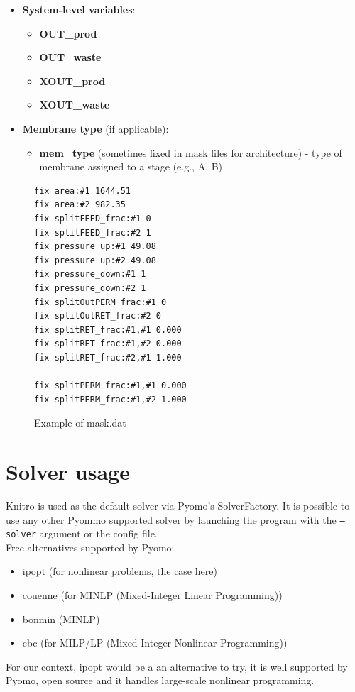 \documentclass[12pt]{article}
\theoremstyle{definition}
\theoremstyle{definition}
\theoremstyle{remark}
\theoremstyle{remark}
\theoremstyle{definition}
\theoremstyle{remark}
\begin{document}
\begin{itemize}
\item \textbf{System-level variables}:
\begin{itemize}
  \item \textbf{OUT\_prod}
  \item \textbf{OUT\_waste}
  \item \textbf{XOUT\_prod}
  \item \textbf{XOUT\_waste}
\end{itemize}

\item \textbf{Membrane type} (if applicable):
	\begin{itemize}
  \item \textbf{mem\_type }(sometimes fixed in mask files for architecture) - type of membrane assigned to a stage (e.g., A, B)
	\end{itemize}


\end{itemize}
\begin{figure}[ht]
	
\begin{mdframed}
	\begin{verbatim}
fix area:#1 1644.51
fix area:#2 982.35
fix splitFEED_frac:#1 0
fix splitFEED_frac:#2 1
fix pressure_up:#1 49.08
fix pressure_up:#2 49.08
fix pressure_down:#1 1
fix pressure_down:#2 1
fix splitOutPERM_frac:#1 0
fix splitOutRET_frac:#2 0
fix splitRET_frac:#1,#1 0.000
fix splitRET_frac:#1,#2 0.000
fix splitRET_frac:#2,#1 1.000

fix splitPERM_frac:#1,#1 0.000
fix splitPERM_frac:#1,#2 1.000
	\end{verbatim}
	
\end{mdframed}
	\caption{Example of mask.dat}
\end{figure}

\section{Solver usage}
Knitro is used as the default solver via Pyomo's SolverFactory. It is possible to use any other Pyommo supported solver by launching the program with the \texttt{--solver} argument or the config file. \\
Free alternatives supported by Pyomo: 
\begin{itemize}
	\item ipopt (for nonlinear problems, the case here)
	\item couenne (for MINLP (Mixed-Integer Linear Programming))
	\item bonmin (MINLP)
	\item cbc (for MILP/LP (Mixed-Integer Nonlinear Programming))
	
\end{itemize}
For our context, ipopt would be a an alternative to try, it is well supported by Pyomo, open source and it handles large-scale nonlinear programming.
\end{document}
